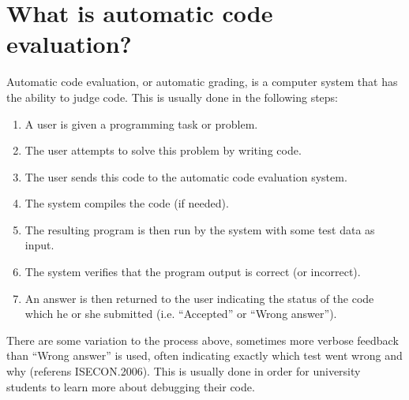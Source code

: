 \section{What is automatic code evaluation?}
Automatic code evaluation, or automatic grading, is a computer system that has the ability to judge code. This is usually done in the following steps:
\begin{enumerate}
  \item A user is given a programming task or problem.
  \item The user attempts to solve this problem by writing code.
  \item The user sends this code to the automatic code evaluation system.
  \item The system compiles the code (if needed).
  \item The resulting program is then run by the system with some test data as input.
  \item The system verifies that the program output is correct (or incorrect). 
  \item An answer is then returned to the user indicating the status of the code which he or she submitted (i.e. ``Accepted'' or ``Wrong answer'').
\end{enumerate}
There are some variation to the process above, sometimes more verbose feedback than ``Wrong answer'' is used, often indicating exactly which test went wrong and why (referens ISECON.2006). This is usually done in order for university students to learn more about debugging their code.